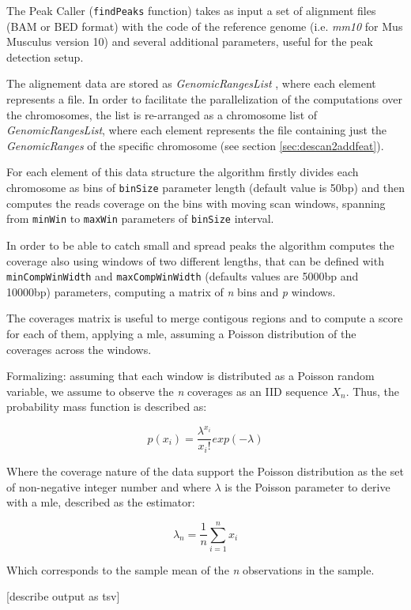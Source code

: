 The Peak Caller (\lstinline{findPeaks} function) takes as input a set of alignment files (BAM \cite{Li2009} or BED format) with the code of the reference genome (i.e. \textit{mm10} for Mus Musculus version 10) and several additional parameters, useful for the peak detection setup.

The alignement data are stored as \textit{GenomicRangesList} \cite{Lawrence2013}, where each element represents a file. 
In order to facilitate the parallelization of the computations over the chromosomes, the list is re-arranged as a chromosome list of \textit{GenomicRangesList}, where each element represents the file containing just the \textit{GenomicRanges} of the specific chromosome (see section \ref{sec:descan2addfeat}).

For each element of this data structure the algorithm firstly divides each chromosome as bins of \lstinline{binSize} parameter length (default value is 50bp) and then computes the reads coverage on the bins with moving scan windows, spanning from \lstinline{minWin} to \lstinline{maxWin} parameters of \lstinline{binSize} interval.

In order to be able to catch small and spread peaks the algorithm computes the coverage also using windows of two different lengths, that can be defined with \lstinline{minCompWinWidth} and \lstinline{maxCompWinWidth} (defaults values are 5000bp and 10000bp) parameters, computing a matrix of \textit{n} bins and \textit{p} windows.

The coverages matrix is useful to merge contigous regions and to compute a score for each of them, applying a \gls{mle}, assuming a Poisson distribution of the coverages across the windows.

Formalizing: assuming that each window is distributed as a Poisson random variable, we assume to observe the \textit{n} coverages as an IID sequence $X_n$. Thus, the probability mass function is described as:

\[ p(x_i) = \frac{\lambda^{x_i}}{{x_i!}} exp(-\lambda)\]

Where the coverage nature of the data support the Poisson distribution as the set of non-negative integer number and where $\lambda$ is the Poisson parameter to derive with a \gls{mle}, described as the estimator:

\[\lambda_n=\frac{1}{n}\sum_{i=1}^{n}x_i\]

Which corresponds to the sample mean of the \textit{n} observations in the sample.



[describe output as tsv]


